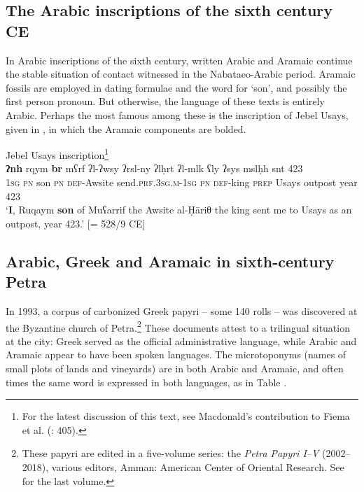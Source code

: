 \documentclass[output=paper]{langsci/langscibook}
\begin{document}
\subsection{The Arabic inscriptions of the sixth century CE}
In Arabic inscriptions of the sixth century, written Arabic and Aramaic continue the stable situation of contact witnessed in the Nabataeo-Arabic period. Aramaic fossils are employed in dating formulae and the word for ‘son’, and possibly the first person pronoun. But otherwise, the language of these texts is entirely Arabic. Perhaps the most famous among these is the inscription of Jebel Usays, given in , in which the Aramaic components are bolded.

\ea\label{Usays} Jebel Usays inscription\footnote{For the latest discussion of this text, see Macdonald’s contribution to Fiema et al. (\citeyear{Fiemaetal2015}: 405).}\\
\gll   \textbf{ʔnh}\footnotemark{} rqym \textbf{br} mʕrf ʔl-ʔwsy ʔrsl-ny ʔlḥrt ʔl-mlk ʕly ʔsys mslḥh snt 423 \\
       \textsc{1sg} \textsc{pn} son \textsc{pn} \textsc{def}-Awsite send.\textsc{prf.3sg.m-1sg} \textsc{pn} \textsc{def}-king \textsc{prep} Usays outpost year 423  \\
\glt   `\textbf{I}, Ruqaym \textbf{son} of Muʕarrif the Awsite al-Ḥāriθ the king sent me to Usays as an outpost, year 423.' [= 528/9 CE]
\z


\subsection{Arabic, Greek and Aramaic in sixth-century Petra}
In 1993, a corpus of carbonized Greek papyri – some 140 rolls – was discovered at the Byzantine church of Petra.\footnote{These papyri are edited in a five-volume series: the \textit{Petra Papyri I--V} (2002--2018), various editors, Amman: American Center of Oriental
Research. See \citet{Arjavaetal2018} for the last volume.} These documents attest to a trilingual situation at the city: Greek served as the official administrative language, while Arabic and Aramaic appear to have been spoken languages. The microtoponyms (names of small plots of lands and vineyards) are in both Arabic and Aramaic, and often times the same word is expressed in both languages, as in Table . 
\end{document}
